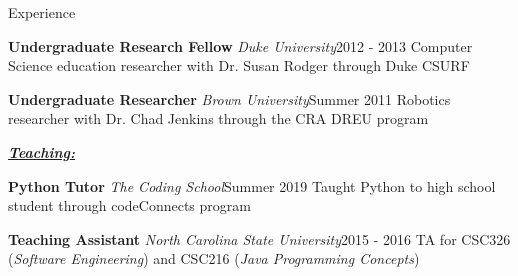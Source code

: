 \documentclass{resume} %
\begin{document}
\begin{rSection}{Experience}
\begin{eSubsection}{\textbf{Undergraduate Research Fellow} \textit{Duke University}}{2012 - 2013}
{Computer Science education researcher with Dr. Susan Rodger through Duke CSURF}
\end{eSubsection}
\vspace{-7pt}

\begin{eSubsection}{\textbf{Undergraduate Researcher} \textit{Brown University}}{Summer 2011}
{Robotics researcher with Dr. Chad Jenkins through the CRA DREU program}
\end{eSubsection}
\vspace{-5pt}

\underline{\textbf{\textit{Teaching:}}}
\vspace{-7pt}

\begin{eSubsection}{\textbf{Python Tutor} \textit{The Coding School}}{Summer 2019}
{Taught Python to high school student through codeConnects program}
\end{eSubsection}
\vspace{-7pt}

\begin{eSubsection}{\textbf{Teaching Assistant} \textit{North Carolina State University}}{2015 - 2016}
{TA for CSC326 (\textit{Software Engineering}) and CSC216 (\textit{Java Programming Concepts})}
\end{eSubsection}
\vspace{-27pt}
\end{rSection}
\end{document}

